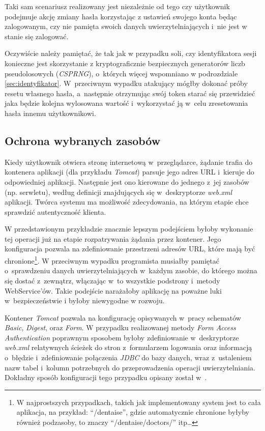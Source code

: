 \documentclass[11pt]{aghdpl}
\begin{document}
Taki sam scenariusz realizowany jest niezależnie od tego czy użytkownik podejmuje akcję zmiany hasła korzystając z ustawień swojego konta będąc zalogowanym, czy nie pamięta swoich danych uwierzytelniających i~nie jest w stanie się zalogować.

Oczywiście należy pamiętać, że tak jak w przypadku soli, czy identyfikatora sesji konieczne jest skorzystanie z kryptograficznie bezpiecznych generatorów liczb pseudolosowych (\emph{CSPRNG}), o~których więcej wspomniano w podrozdziale \ref{sec:identyfikator}. W~przeciwnym wypadku atakujący mógłby dokonać próby resetu własnego hasła, a~następnie otrzymując swój token starać się przewidzieć jaka będzie kolejna wylosowana wartość i~wykorzystać ją w~celu zresetowania hasła innemu użytkownikowi.

\subsection{Ochrona wybranych zasobów}
\label{sec:ochronaWybranychZasobow}

Kiedy użytkownik otwiera stronę internetową w~przeglądarce, żądanie trafia do kontenera aplikacji (dla przykładu \emph{Tomcat}) parsuje jego adres URL i~kieruje do odpowiedniej aplikacji. Następnie jest ono kierowane do jednego z~jej zasobów (np. serwletu), według definicji znajdujących się w~deskryptorze \emph{web.xml} aplikacji. Twórca systemu ma możliwość zdecydowania, na którym etapie chce sprawdzić autentyczność klienta.

W przedstawionym przykładzie znacznie lepszym podejściem byłoby wykonanie tej operacji już na etapie rozpatrywania żądania przez kontener. Jego konfiguracja pozwala na zdefiniowanie przestrzeni adresów URL, które mają być chronione\footnote{W najprostszych przypadkach, takich jak implementowany system jest to cała aplikacja, na przykład: ``/dentaise'', gdzie automatycznie chronione byłyby również podzasoby, to znaczy ``/dentaise/doctors/'' itp\ldots}. W przeciwnym wypadku programista musiałby pamiętać o~sprawdzeniu danych uwierzytelniających w~każdym zasobie, do którego można się dostać z~zewnątrz, włączając w~to wszystkie podstrony i~metody WebService'ów. Takie podejście narażałoby aplikację na poważne luki w~bezpieczeństwie i byłoby niewygodne w rozwoju.

Kontener \emph{Tomcat} pozwala na konfigurację opisywanych w~pracy schematów \emph{Basic}, \emph{Digest}, oraz \emph{Form}. W przypadku realizowanej metody \emph{Form Access Authentication} poprawnym sposobem byłoby zdefiniowanie w~deskryptorze \emph{web.xml} relatywnych ścieżek do stron z~formularzem logowania oraz informacją o~błędzie i~zdefiniowanie połączenia \emph{JDBC} do bazy danych, wraz z~ustaleniem nazw tabel i~kolumn potrzebnych do przeprowadzenia operacji uwierzytelniania. Dokładny sposób konfiguracji tego przypadku opisany został w~\cite{JRUA}.
\end{document}
